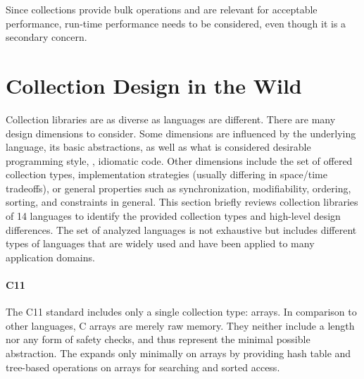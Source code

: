 \documentclass[sigconf, 10pt]{acmart}
\def\LangCnt{14\xspace}
\begin{document}
Since collections provide bulk operations
and are relevant for acceptable performance,
run-time performance needs to be considered,
even though it is a secondary concern.

\section{Collection Design in the Wild}
\label{sec:col-wild}


Collection libraries are as diverse as languages are different.
There are many design dimensions to consider.
Some dimensions are influenced by the underlying language,
its basic abstractions,
as well as what is considered desirable programming style, \ie, idiomatic code.
Other dimensions include the set of offered collection types,
implementation strategies (usually differing in space/time tradeoffs),
or general properties such as synchronization, modifiability, ordering,
sorting, and constraints in general.
%
This section briefly reviews collection libraries of \LangCnt languages
to identify the provided collection types
and high-level design differences.
The set of analyzed languages is not exhaustive but includes different types of languages
that are widely used and have been applied to many application domains.

\paragraph{C11}


The C11 standard includes only a single collection type: arrays.
In comparison to other languages, C arrays are merely raw memory.
They neither include a length nor any form of safety checks,
and thus represent the minimal possible abstraction.
The 
expands only minimally on arrays
by providing hash table and tree-based operations on arrays
for searching and sorted access.
\end{document}
